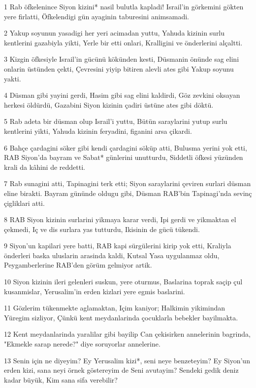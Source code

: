 \par 1 Rab öfkelenince Siyon kizini* nasil bulutla kapladi! Israil'in görkemini gökten yere firlatti, Öfkelendigi gün ayaginin taburesini animsamadi.
\par 2 Yakup soyunun yasadigi her yeri acimadan yuttu, Yahuda kizinin surlu kentlerini gazabiyla yikti, Yerle bir etti onlari, Kralligini ve önderlerini alçaltti.
\par 3 Kizgin öfkesiyle Israil'in gücünü kökünden kesti, Düsmanin önünde sag elini onlarin üstünden çekti, Çevresini yiyip bitiren alevli ates gibi Yakup soyunu yakti.
\par 4 Düsman gibi yayini gerdi, Hasim gibi sag elini kaldirdi, Göz zevkini oksayan herkesi öldürdü, Gazabini Siyon kizinin çadiri üstüne ates gibi döktü.
\par 5 Rab adeta bir düsman olup Israil'i yuttu, Bütün saraylarini yutup surlu kentlerini yikti, Yahuda kizinin feryadini, figanini arsa çikardi.
\par 6 Bahçe çardagini söker gibi kendi çardagini söküp atti, Bulusma yerini yok etti, RAB Siyon'da bayram ve Sabat* günlerini unutturdu, Siddetli öfkesi yüzünden krali da kâhini de reddetti.
\par 7 Rab sunagini atti, Tapinagini terk etti; Siyon saraylarini çeviren surlari düsman eline birakti. Bayram gününde oldugu gibi, Düsman RAB'bin Tapinagi'nda sevinç çigliklari atti.
\par 8 RAB Siyon kizinin surlarini yikmaya karar verdi, Ipi gerdi ve yikmaktan el çekmedi, Iç ve dis surlara yas tutturdu, Ikisinin de gücü tükendi.
\par 9 Siyon'un kapilari yere batti, RAB kapi sürgülerini kirip yok etti, Kraliyla önderleri baska uluslarin arasinda kaldi, Kutsal Yasa uygulanmaz oldu, Peygamberlerine RAB'den görüm gelmiyor artik.
\par 10 Siyon kizinin ileri gelenleri suskun, yere oturmus, Baslarina toprak saçip çul kusanmislar, Yerusalim'in erden kizlari yere egmis baslarini.
\par 11 Gözlerim tükenmekte aglamaktan, Içim kaniyor; Halkimin yikimindan Yüregim sizliyor, Çünkü kent meydanlarinda çocuklarla bebekler bayilmakta.
\par 12 Kent meydanlarinda yaralilar gibi bayilip Can çekisirken annelerinin bagrinda, "Ekmekle sarap nerede?" diye soruyorlar annelerine.
\par 13 Senin için ne diyeyim? Ey Yerusalim kizi*, seni neye benzeteyim? Ey Siyon'un erden kizi, sana neyi örnek göstereyim de Seni avutayim? Sendeki gedik deniz kadar büyük, Kim sana sifa verebilir?
